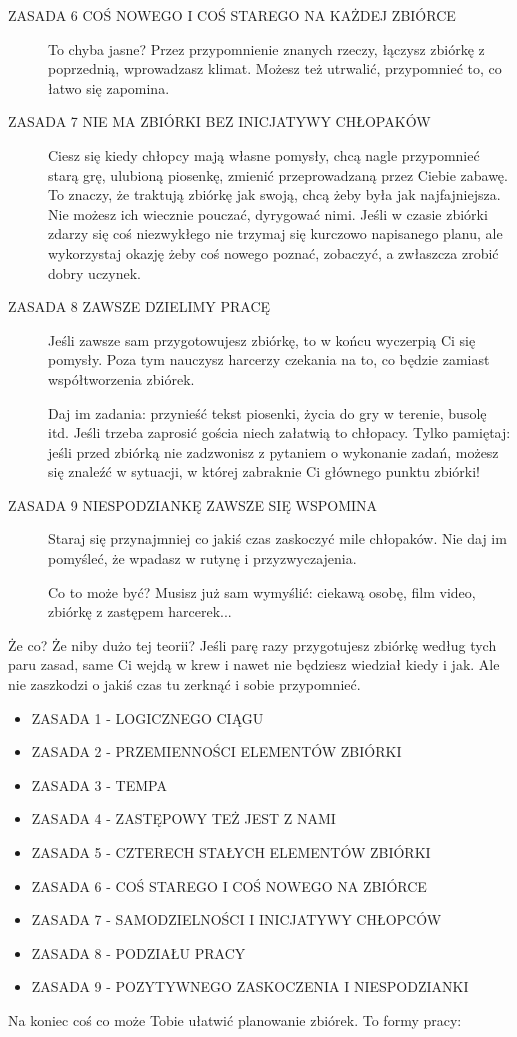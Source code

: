 \begin{description}
\item
[ZASADA  6 COŚ NOWEGO I COŚ STAREGO NA KAŻDEJ ZBIÓRCE]
To chyba jasne? 
Przez przypomnienie znanych rzeczy, łączysz zbiórkę z poprzednią, wprowadzasz klimat. 
Możesz też utrwalić, przypomnieć to, co łatwo  się  zapomina.
\item
[ZASADA 7 NIE MA ZBIÓRKI BEZ INICJATYWY CHŁOPAKÓW]
Ciesz się kiedy chłopcy mają własne pomysły, chcą nagle przypomnieć starą grę, ulubioną piosenkę, zmienić przeprowadzaną przez Ciebie zabawę. 
To znaczy, że traktują zbiórkę jak swoją, chcą żeby była jak najfajniejsza. 
Nie możesz ich wiecznie pouczać, dyrygować  nimi. 
Jeśli w czasie zbiórki zdarzy się coś niezwykłego nie trzymaj się kurczowo napisanego  planu, ale wykorzystaj okazję żeby coś nowego poznać, zobaczyć, a zwłaszcza zrobić dobry  uczynek.
\item
[ZASADA  8 ZAWSZE DZIELIMY PRACĘ]
Jeśli zawsze sam przygotowujesz zbiórkę, to w końcu wyczerpią Ci się pomysły. Poza tym nauczysz harcerzy czekania na to, co będzie zamiast współtworzenia zbiórek.

Daj im zadania: przynieść tekst piosenki, życia do gry w terenie, busolę itd. Jeśli trzeba zaprosić gościa niech załatwią to chłopacy. Tylko pamiętaj: jeśli przed zbiórką nie zadzwonisz z pytaniem o wykonanie zadań, możesz się znaleźć w sytuacji, w której zabraknie Ci głównego punktu zbiórki!
\item
[ZASADA  9 NIESPODZIANKĘ ZAWSZE SIĘ WSPOMINA]
Staraj się przynajmniej co jakiś czas zaskoczyć mile chłopaków. Nie daj  im  pomyśleć,  że  wpadasz  w  rutynę i przyzwyczajenia.
	
	Co to może być? Musisz już sam wymyślić: ciekawą osobę, film video,  zbiórkę z zastępem harcerek...
\end{description}
	Że co? Że niby dużo tej teorii? Jeśli parę razy przygotujesz zbiórkę według  tych  paru zasad, same Ci  wejdą w krew i nawet nie będziesz wiedział kiedy i jak. Ale nie zaszkodzi  o jakiś czas tu zerknąć i  sobie  przypomnieć.
\begin{itemize}

\item ZASADA 1 - LOGICZNEGO  CIĄGU
\item ZASADA 2 - PRZEMIENNOŚCI ELEMENTÓW ZBIÓRKI
\item ZASADA 3 - TEMPA
\item ZASADA 4 - ZASTĘPOWY TEŻ JEST Z NAMI
\item ZASADA 5 -  CZTERECH  STAŁYCH  ELEMENTÓW ZBIÓRKI
\item ZASADA 6 -  COŚ  STAREGO I  COŚ NOWEGO NA ZBIÓRCE
\item ZASADA 7 -  SAMODZIELNOŚCI I INICJATYWY CHŁOPCÓW
\item ZASADA 8 - PODZIAŁU PRACY
\item ZASADA 9 - POZYTYWNEGO ZASKOCZENIA I NIESPODZIANKI

\end{itemize}
Na koniec coś co może Tobie  ułatwić planowanie zbiórek. To formy pracy:

